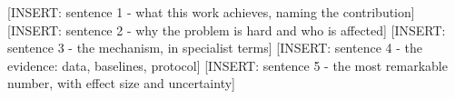 [INSERT: sentence 1 - what this work achieves, naming the contribution]
[INSERT: sentence 2 - why the problem is hard and who is affected]
[INSERT: sentence 3 - the mechanism, in specialist terms]
[INSERT: sentence 4 - the evidence: data, baselines, protocol]
[INSERT: sentence 5 - the most remarkable number, with effect size and uncertainty]
